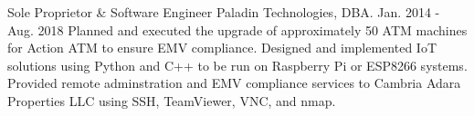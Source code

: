 

\begin{cventries}

  \cventry
    {Sole Proprietor \& Software Engineer} %
    {Paladin Technologies, DBA.} %
    {Jan. 2014 - Aug. 2018} %
    {} %
    {
			Planned and executed the upgrade of approximately 50 ATM
			machines for Action ATM to ensure EMV compliance. Designed
			and implemented IoT solutions using Python and C++ to be run
			on Raspberry Pi or ESP8266 systems. Provided remote
			adminstration and EMV compliance services to
			Cambria Adara Properties LLC using SSH, TeamViewer, VNC, and
			nmap.
    }

\end{cventries}
